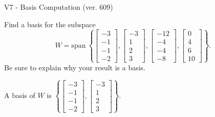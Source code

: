 \begin{exercise}
  \begin{exerciseTitle}V7 - Basis Computation (ver. 609)\end{exerciseTitle}
  \begin{exerciseStatement}
    Find a basis for the subspace 
\[W=\mathrm{span}\ \left\{\left[\begin{array}{r}
-3 \\
-1 \\
-1 \\
-2
\end{array}\right] , \left[\begin{array}{r}
-3 \\
1 \\
2 \\
3
\end{array}\right] , \left[\begin{array}{r}
-12 \\
-4 \\
-4 \\
-8
\end{array}\right] , \left[\begin{array}{r}
0 \\
4 \\
6 \\
10
\end{array}\right]\right\}.\]
 Be sure to explain why your result is a basis.


  \end{exerciseStatement}
  \begin{exerciseAnswer}
   A basis of \(W\) is  \(\left\{\left[\begin{array}{r}
-3 \\
-1 \\
-1 \\
-2
\end{array}\right] , \left[\begin{array}{r}
-3 \\
1 \\
2 \\
3
\end{array}\right]\right\}\).
  


  \end{exerciseAnswer}
\end{exercise}